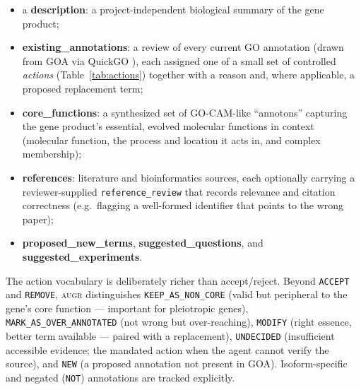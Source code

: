 \documentclass[11pt]{article}
\providecommand{\tightlist}{%
  \setlength{\itemsep}{0pt}\setlength{\parskip}{0pt}}
\newcommand{\augr}{\textsc{augr}}
\newcommand{\code}[1]{\texttt{#1}}
\begin{document}
\begin{itemize}
\tightlist
\item a \textbf{description}: a project-independent biological summary of the gene
product;
\item \textbf{existing\_annotations}: a review of every current GO annotation
(drawn from GOA via QuickGO \cite{quickgo}), each assigned one of a small set of
controlled \emph{actions} (Table~\ref{tab:actions}) together with a reason and, where
applicable, a proposed replacement term;
\item \textbf{core\_functions}: a synthesized set of GO-CAM-like
\cite{thomas2019} ``annotons'' capturing the gene product's essential, evolved
molecular functions in context (molecular function, the process and location it
acts in, and complex membership);
\item \textbf{references}: literature and bioinformatics sources, each optionally
carrying a reviewer-supplied \code{reference\_review} that records relevance and
citation correctness (e.g.\ flagging a well-formed identifier that points to the
wrong paper);
\item \textbf{proposed\_new\_terms}, \textbf{suggested\_questions}, and
\textbf{suggested\_experiments}.
\end{itemize}

The action vocabulary is deliberately richer than accept/reject. Beyond
\code{ACCEPT} and \code{REMOVE}, \augr{} distinguishes \code{KEEP\_AS\_NON\_CORE}
(valid but peripheral to the gene's core function --- important for pleiotropic
genes), \code{MARK\_AS\_OVER\_ANNOTATED} (not wrong but over-reaching),
\code{MODIFY} (right essence, better term available --- paired with a replacement),
\code{UNDECIDED} (insufficient accessible evidence; the mandated action when the
agent cannot verify the source), and \code{NEW} (a proposed annotation not present
in GOA). Isoform-specific and negated (\code{NOT}) annotations are tracked
explicitly.
\end{document}
